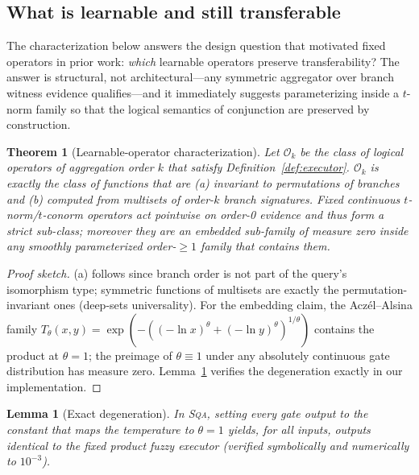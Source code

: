 \documentclass[journal]{IEEEtran}
\newtheorem{theorem}{Theorem}
\newtheorem{lemma}{Lemma}
\newcommand{\SQA}{\textsc{Sqa}}
\begin{document}
\subsection{What is learnable and still transferable}

The characterization below answers the design question that motivated
fixed operators in prior work: \emph{which} learnable operators preserve
transferability? The answer is structural, not architectural---any
symmetric aggregator over branch witness evidence qualifies---and it
immediately suggests parameterizing inside a $t$-norm family so that the
logical semantics of conjunction are preserved by construction.

\begin{theorem}[Learnable-operator characterization]\label{thm:learn}
Let $\mathcal O_k$ be the class of logical operators of aggregation order
$k$ that satisfy Definition~\ref{def:executor}. $\mathcal O_k$ is exactly
the class of functions that are (a) invariant to permutations of branches
and (b) computed from multisets of order-$k$ branch signatures. Fixed
continuous $t$-norm/$t$-conorm operators act pointwise on order-0 evidence
and thus form a strict sub-class; moreover they are an embedded sub-family
of measure zero inside any smoothly parameterized order-$\ge 1$ family that
contains them.
\end{theorem}
\begin{proof}[Proof sketch]
(a) follows since branch order is not part of the query's isomorphism type;
symmetric functions of multisets are exactly the permutation-invariant ones
(deep-sets universality). For the embedding claim, the Acz\'el--Alsina
family $T_\theta(x,y)=\exp(-((-\ln x)^\theta+(-\ln y)^\theta)^{1/\theta})$
contains the product at $\theta=1$; the preimage of $\theta\equiv 1$ under
any absolutely continuous gate distribution has measure zero.
Lemma~\ref{lem:degen} verifies the degeneration exactly in our
implementation.
\end{proof}

\begin{lemma}[Exact degeneration]\label{lem:degen}
In \SQA{}, setting every gate output to the constant that maps the
temperature to $\theta=1$ yields, for all inputs, outputs identical to the
fixed product fuzzy executor (verified symbolically and numerically to
$10^{-3}$).
\end{lemma}
\end{document}

